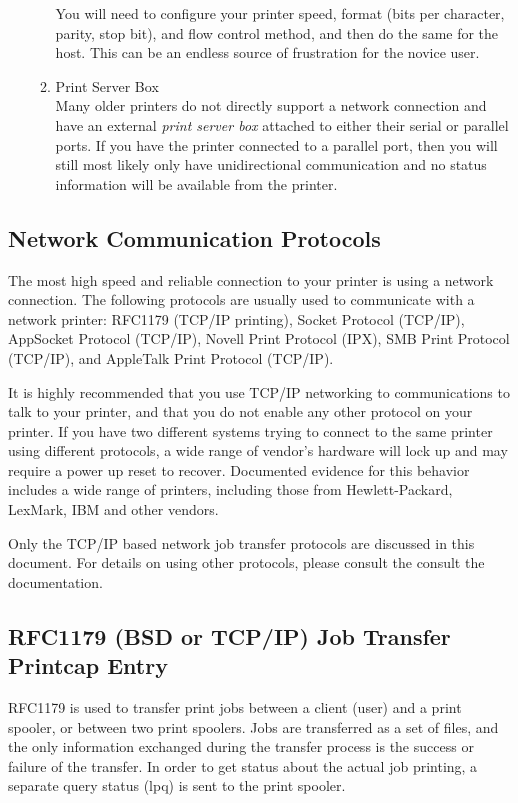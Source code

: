\documentclass[a4paper]{article}
\begin{document}
\begin{enumerate}
\begin{enumerate}
You will need to configure your printer speed,
format (bits per character, parity, stop bit), 
and flow control method,
and then do the same for the host.
This can be an endless source of frustration for the novice user.
\item Print Server Box\\ 
Many older printers do not directly support a network connection
and have an external {\itshape print server box\/} attached to either their
serial or parallel ports.
If you have the printer connected to a parallel port,
then you will still most likely only have unidirectional communication
and no status information will be available from the printer.
\end{enumerate}
\end{enumerate}



\subsection{Network Communication Protocols
\label{networkprotocols}}

The most high speed and reliable connection to your printer is using a
network connection.
The following protocols are usually used to communicate with a network printer:
RFC1179 (TCP/IP printing),
Socket Protocol (TCP/IP),
AppSocket Protocol (TCP/IP),
Novell Print Protocol (IPX),
SMB Print Protocol (TCP/IP),
and AppleTalk Print Protocol (TCP/IP).

It is highly recommended that you use TCP/IP networking to communications to
talk to your printer,
and that you do not enable any other protocol on your printer.
If you have two different systems trying to connect to the same printer
using different protocols,
a wide range of vendor's hardware will lock up and may require a power up reset
to recover.
Documented evidence for this behavior includes a wide range of
printers, including those from Hewlett-Packard, LexMark, IBM and other vendors.

Only the TCP/IP based network job transfer protocols are discussed in
this document.
For details on using other protocols,
please consult the consult the
documentation.


\subsection{RFC1179 (BSD or TCP/IP) Job Transfer Printcap Entry
\label{rfc1179pc}}

RFC1179 is used to transfer print jobs between
a client (user) and a print spooler,
or between two print spoolers.
Jobs are transferred as a set of files,
and the only information exchanged during the transfer process is the
success or failure of the transfer.
In order to get status about the actual job printing,
a separate query status ({\ttfamily lpq}) is sent to the print spooler.
\end{document}
